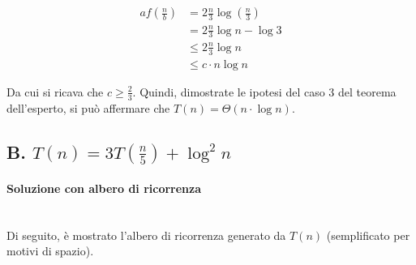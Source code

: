 \documentclass{article}
\begin{document}
\begin{align*}
    af\left(\frac{n}{b}\right) &= 2 \frac{n}{3} \log \left(\frac{n}{3}\right)\\
  &=  2 \frac{n}{3} \log n - \log 3\\
  &\leq 2 \frac{n}{3} \log n\\
  &\leq c \cdot n  \log n
\end{align*}

Da cui si ricava che $c \geq \frac{2}{3}$. Quindi, dimostrate le ipotesi del caso 3 del teorema dell'esperto, si può affermare che $T(n) = \Theta(n \cdot \log n)$.

\subsection*{B. $T(n) = 3T(\frac{n}{5})+\log^2 n$}
\paragraph{Soluzione con albero di ricorrenza}\mbox{}\\

Di seguito, è mostrato l'albero di ricorrenza generato da $T(n)$ (semplificato per motivi di spazio).
\end{document}
